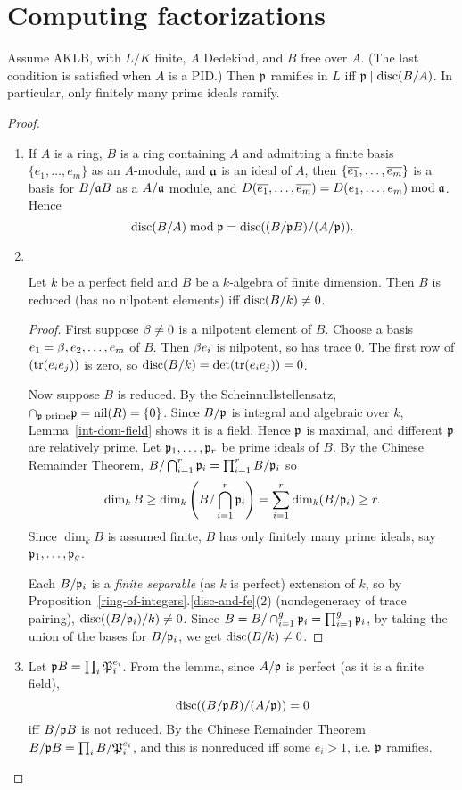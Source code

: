 \section{Computing factorizations}
\begin{thm}
Assume AKLB, with $L/K$ finite, $A$ Dedekind, and $B$ free over $A$. (The last condition is satisfied when $A$ is a PID.) Then $\mathfrak{p}$ ramifies in $L$ iff $\mathfrak{p}\mid \operatorname{disc}(B/A)$. In particular, only finitely many prime ideals ramify.
\end{thm}
\begin{proof}$\,$
\begin{enumerate}
\item
If $A$ is a ring, $B$ is a ring containing $A$ and admitting a finite basis $\{e_1,\ldots, e_m\}$ as an $A$-module, and $\mathfrak{a}$ is an ideal of $A$, then $\{\overline{e_1},\ldots, \overline{e_m}\}$ is a basis for $B/\mathfrak{a} B$ as a $A/\mathfrak{a}$ module, and $D(\overline{e_1},\ldots, \overline{e_m})= D(e_1,\ldots, e_m)\bmod{\mathfrak{a}}$. Hence
\[
\operatorname{disc}(B/A)\bmod \mathfrak{p}=\operatorname{disc}((B/\mathfrak{p} B)/(A/\mathfrak{p})).
\]
\item$\,$\vspace{-.9cm}
\begin{lem}
Let $k$ be a perfect field and $B$ be a $k$-algebra of finite dimension. Then $B$ is reduced (has no nilpotent elements) iff $\operatorname{disc}(B/k)\ne 0$.
\end{lem}
\begin{proof}
First suppose $\beta\ne 0$ is a nilpotent element of $B$. Choose a basis $e_1=\beta, e_2,\ldots, e_m$ of $B$. Then $\beta e_i$ is nilpotent, so has trace 0. The first row of $(\operatorname{tr}(e_ie_j))$ is zero, so $\operatorname{disc}(B/k)=\det(\operatorname{tr}(e_ie_j))=0$.

Now suppose $B$ is reduced. By the Scheinnullstellensatz, $\cap_{\mathfrak{p} \text{ prime}} \mathfrak{p} =\text{nil}(R)=\{0\}$. Since $B/\mathfrak{p}$ is integral and algebraic over $k$, Lemma~\ref{int-dom-field} shows it is a field. Hence $\mathfrak{p}$ is maximal, and different $\mathfrak{p}$ are relatively prime. Let $\mathfrak{p}_1,\ldots, \mathfrak{p}_r$ be prime ideals of $B$. By the Chinese Remainder Theorem, $B/\bigcap_{i=1}^r \mathfrak{p}_i=\prod_{i=1}^r B/\mathfrak{p}_i$ so
\[
\dim_k B\ge \dim_k\left( {B/\bigcap_{i=1}^r \mathfrak{p}_i} \right)= \sum_{i=1}^r \dim_k (B/\mathfrak{p}_i)\ge r.
\]
Since $\dim_k B$ is assumed finite, $B$ has only finitely many prime ideals, say $\mathfrak{p}_1,\ldots, \mathfrak{p}_g$.

Each $B/\mathfrak{p}_i$ is a {\it{finite separable}} (as $k$ is perfect) extension of $k$, so by Proposition~\ref{ring-of-integers}.\ref{disc-and-fe}(2) (nondegeneracy of trace pairing), $\operatorname{disc}((B/\mathfrak{p}_i)/k)\ne 0$. Since $B=B/\cap_{i=1}^g \mathfrak{p}_i=\prod_{i=1}^g \mathfrak{p}_i$, by taking the union of the bases for $B/\mathfrak{p}_i$, we get $\operatorname{disc}(B/k)\ne 0$.
\end{proof}
\item 
Let $\mathfrak{p} B=\prod_i \mathfrak{P}_i^{e_i}$. 
From the lemma, since $A/\mathfrak{p}$ is perfect (as it is a finite field), \[\operatorname{disc}((B/\mathfrak{p} B)/(A/\mathfrak{p}))=0\] iff $B/\mathfrak{p} B$ is not reduced. By the Chinese Remainder Theorem $B/\mathfrak{p} B=\prod_i B/\mathfrak{P}_i^{e_i}$, and this is nonreduced iff some $e_i>1$, i.e. $\mathfrak{p}$ ramifies.\qedhere
\end{enumerate}
\end{proof}
